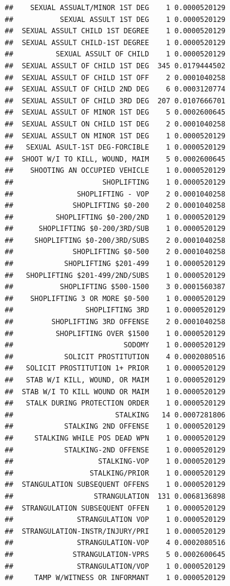 \documentclass[]{book}
\begin{document}
\begin{verbatim}
##    SEXUAL ASSUALT/MINOR 1ST DEG    1 0.0000520129
##           SEXUAL ASSULT 1ST DEG    1 0.0000520129
##  SEXUAL ASSULT CHILD 1ST DEGREE    1 0.0000520129
##  SEXUAL ASSULT CHILD-1ST DEGREE    1 0.0000520129
##          SEXUAL ASSULT OF CHILD    1 0.0000520129
##  SEXUAL ASSULT OF CHILD 1ST DEG  345 0.0179444502
##  SEXUAL ASSULT OF CHILD 1ST OFF    2 0.0001040258
##  SEXUAL ASSULT OF CHILD 2ND DEG    6 0.0003120774
##  SEXUAL ASSULT OF CHILD 3RD DEG  207 0.0107666701
##  SEXUAL ASSULT OF MINOR 1ST DEG    5 0.0002600645
##  SEXUAL ASSULT ON CHILD 1ST DEG    2 0.0001040258
##  SEXUAL ASSULT ON MINOR 1ST DEG    1 0.0000520129
##   SEXUAL ASULT-1ST DEG-FORCIBLE    1 0.0000520129
##  SHOOT W/I TO KILL, WOUND, MAIM    5 0.0002600645
##    SHOOTING AN OCCUPIED VEHICLE    1 0.0000520129
##                     SHOPLIFTING    1 0.0000520129
##               SHOPLIFTING - VOP    2 0.0001040258
##              SHOPLIFTING $0-200    2 0.0001040258
##          SHOPLIFTING $0-200/2ND    1 0.0000520129
##      SHOPLIFTING $0-200/3RD/SUB    1 0.0000520129
##     SHOPLIFTING $0-200/3RD/SUBS    2 0.0001040258
##              SHOPLIFTING $0-500    2 0.0001040258
##            SHOPLIFTING $201-499    1 0.0000520129
##   SHOPLIFTING $201-499/2ND/SUBS    1 0.0000520129
##           SHOPLIFTING $500-1500    3 0.0001560387
##    SHOPLIFTING 3 OR MORE $0-500    1 0.0000520129
##                 SHOPLIFTING 3RD    1 0.0000520129
##         SHOPLIFTING 3RD OFFENSE    2 0.0001040258
##          SHOPLIFTING OVER $1500    1 0.0000520129
##                          SODOMY    1 0.0000520129
##            SOLICIT PROSTITUTION    4 0.0002080516
##   SOLICIT PROSTITUTION 1+ PRIOR    1 0.0000520129
##   STAB W/I KILL, WOUND, OR MAIM    1 0.0000520129
##  STAB W/I TO KILL WOUND OR MAIM    1 0.0000520129
##   STALK DURING PROTECTION ORDER    1 0.0000520129
##                        STALKING   14 0.0007281806
##            STALKING 2ND OFFENSE    1 0.0000520129
##     STALKING WHILE POS DEAD WPN    1 0.0000520129
##            STALKING-2ND OFFENSE    1 0.0000520129
##                    STALKING-VOP    1 0.0000520129
##                  STALKING/PRIOR    1 0.0000520129
##  STANGULATION SUBSEQUENT OFFENS    1 0.0000520129
##                   STRANGULATION  131 0.0068136898
##  STRANGULATION SUBSEQUENT OFFEN    1 0.0000520129
##               STRANGULATION VOP    1 0.0000520129
##  STRANGULATION-INSTR/INJURY/PRI    1 0.0000520129
##               STRANGULATION-VOP    4 0.0002080516
##              STRANGULATION-VPRS    5 0.0002600645
##               STRANGULATION/VOP    1 0.0000520129
##     TAMP W/WITNESS OR INFORMANT    1 0.0000520129

\end{verbatim}
\end{document}
